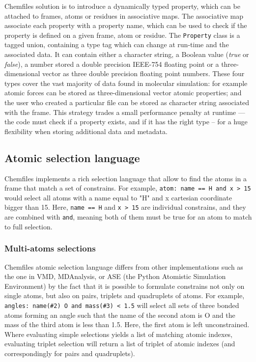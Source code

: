 \documentclass[thesis]{subfiles}
\begin{document}
Chemfiles solution is to introduce a dynamically typed property, which can be
attached to frames, atoms or residues in associative maps. The associative map
associate each property with a property name, which can be used to check if the
property is defined on a given frame, atom or residue. The \texttt{Property}
class is a tagged union, containing a type tag which can change at run-time and
the associated data. It can contain either a character string, a Boolean value
(\emph{true} or \emph{false}), a number stored a double precision IEEE-754
floating point or a three-dimensional vector as three double precision floating
point numbers. These four types cover the vast majority of data found in
molecular simulation: for example atomic forces can be stored as
three-dimensional vector atomic properties; and the user who created a
particular file can be stored as character string associated with the frame.
This strategy trades a small performance penalty at runtime --- the code must
check if a property exists, and if it has the right type -- for a huge
flexibility when storing additional data and metadata.

\subsection{Atomic selection language}
\label{sec:chemfiles:selections}
\newcommand{\token}[1]{\texttt{\bfseries#1}}

Chemfiles implements a rich selection language that allow to find the atoms in a
frame that match a set of constrains. For example, \texttt{atom: name == H and x
> 15} would select all atoms with a name equal to "H" and x cartesian coordinate
bigger than 15. Here, \texttt{name == H} and \texttt{x > 15} are individual
constrains, and they are combined with \texttt{and}, meaning both of them must
be true for an atom to match to full selection.

\subsubsection{Multi-atoms selections}

Chemfiles atomic selection language differs from other implementations such as
the one in VMD, MDAnalysis, or ASE (the Python Atomistic Simulation Environment)
by the fact that it is possible to formulate constrains not only on single
atoms, but also on pairs, triplets and quadruplets of atoms. For example,
\texttt{angles: name(\#2) O and mass(\#3) < 1.5} will select all sets of three
bonded atoms forming an angle such that the name of the second atom is O and the
mass of the third atom is less than 1.5. Here, the first atom is left
unconstrained. Where evaluating simple selections yields a list of matching
atomic indexes, evaluating triplet selection will return a list of triplet of
atomic indexes (and correspondingly for pairs and quadruplets).
\end{document}
